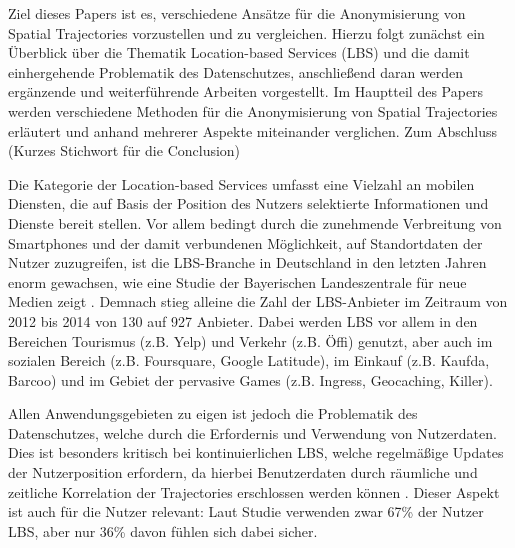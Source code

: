 Ziel dieses Papers ist es, verschiedene Ansätze für die Anonymisierung von Spatial Trajectories vorzustellen und zu vergleichen. Hierzu folgt zunächst ein Überblick über die Thematik Location-based Services (LBS) und die damit einhergehende Problematik des Datenschutzes, anschließend daran werden ergänzende und weiterführende Arbeiten vorgestellt. Im Hauptteil des Papers werden verschiedene Methoden für die Anonymisierung von Spatial Trajectories erläutert und anhand mehrerer Aspekte miteinander verglichen. Zum Abschluss (Kurzes Stichwort für die Conclusion)

Die Kategorie der Location-based Services umfasst eine Vielzahl an mobilen Diensten, die auf Basis der Position des Nutzers selektierte Informationen und Dienste bereit stellen. Vor allem bedingt durch die zunehmende Verbreitung von Smartphones und der damit verbundenen Möglichkeit, auf Standortdaten der Nutzer zuzugreifen, ist die LBS-Branche in Deutschland in den letzten Jahren enorm gewachsen, wie eine Studie der Bayerischen Landeszentrale für neue Medien zeigt \cite{Consulting2014}. Demnach stieg alleine die Zahl der LBS-Anbieter im Zeitraum von 2012 bis 2014 von 130 auf 927 Anbieter. Dabei werden LBS vor allem in den Bereichen Tourismus (z.B. Yelp) und Verkehr (z.B. Öffi) genutzt, aber auch im sozialen Bereich (z.B. Foursquare, Google Latitude), im Einkauf (z.B. Kaufda, Barcoo) und im Gebiet der pervasive Games (z.B. Ingress, Geocaching, Killer).

Allen Anwendungsgebieten zu eigen ist jedoch die Problematik des Datenschutzes, welche durch die Erfordernis und Verwendung von Nutzerdaten. Dies ist besonders kritisch bei kontinuierlichen LBS, welche regelmäßige Updates der Nutzerposition erfordern, da hierbei Benutzerdaten durch räumliche und zeitliche Korrelation der Trajectories erschlossen werden können \cite{Chow2011}. Dieser Aspekt ist auch für die Nutzer relevant: Laut Studie verwenden zwar 67\% der Nutzer LBS, aber nur 36\% davon fühlen sich dabei sicher.


